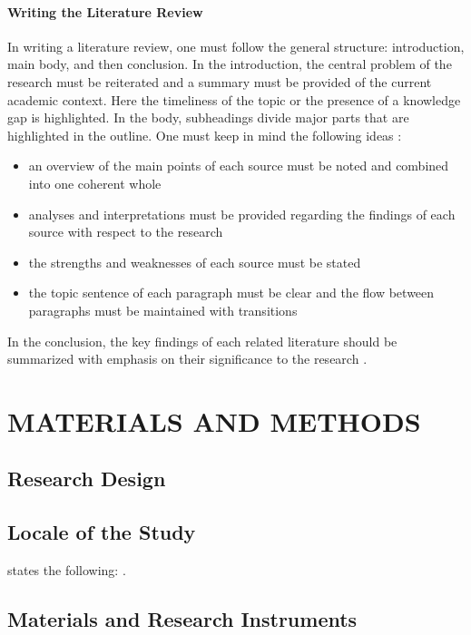 \documentclass{strrespaper-trad}
\begin{document}
		\paragraph{Writing the Literature Review}
			In writing a literature review, one must follow the general structure: introduction, main body, and then conclusion.
			In the introduction, the central problem of the research must be reiterated and a summary must be provided of the current academic context.
			Here the timeliness of the topic or the presence of a knowledge gap is highlighted.
			In the body, subheadings divide major parts that are highlighted in the outline.
			One must keep in mind the following ideas \autocite{mccombesLiteratureReviewComplete2019}:
			\begin{itemize}
				\item an overview of the main points of each source must be noted and combined into one coherent whole
				\item analyses and interpretations must be provided regarding the findings of each source with respect to the research
				\item the strengths and weaknesses of each source must be stated
				\item the topic sentence of each paragraph must be clear and the flow between paragraphs must be maintained with transitions
			\end{itemize}
			In the conclusion, the key findings of each related literature should be summarized with emphasis on their significance to the research \autocite{mccombesLiteratureReviewComplete2019}.

	\section{MATERIALS AND METHODS}
		\subsection{Research Design}
			\lipsum[10]

		\subsection{Locale of the Study}
			\textcite{letcherWindEnergyEngineering2017} states the following: \lipsum[11].

		\subsection{Materials and Research Instruments}
			\lipsum[12]
\end{document}
